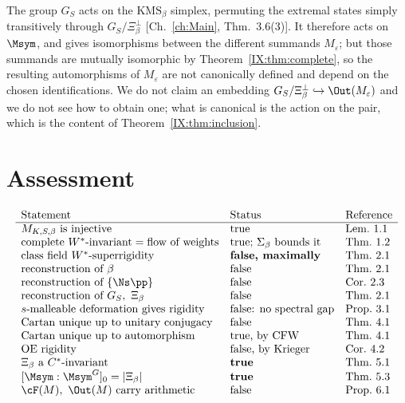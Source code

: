 \begin{remark}\label{IX:rem:out}
The group $G_S$ acts on the $\mathrm{KMS}_\beta$ simplex, permuting the extremal states
simply transitively through $G_S/\Xi_\beta^\perp$ [Ch.~\ref{ch:Main}, Thm.~3.6(3)]. It therefore acts
on $\Msym$, and gives isomorphisms between the different summands $M_\varepsilon$; but those
summands are mutually isomorphic by Theorem~\ref{IX:thm:complete}, so the resulting
automorphisms of $M_\varepsilon$ are not canonically defined and depend on the chosen
identifications. We do not claim an embedding $G_S/\Xi_\beta^\perp\hookrightarrow\Out(M_\varepsilon)$
and we do not see how to obtain one; what is canonical is the action on the pair, which is
the content of Theorem~\ref{IX:thm:inclusion}.
\end{remark}

\section{Assessment}

\[
\begin{array}{lll}
\text{Statement} & \text{Status} & \text{Reference}\\\hline
M_{K,S,\beta}\ \text{is injective} & \text{true} & \text{Lem.~1.1}\\
\text{complete }W^*\text{-invariant}=\text{flow of weights} & \text{true; }\Sigma_\beta\text{ bounds it} & \text{Thm.~1.2}\\
\text{class field }W^*\text{-superrigidity} & \textbf{false, maximally} & \text{Thm.~2.1}\\
\text{reconstruction of }\beta & \text{false} & \text{Thm.~2.1}\\
\text{reconstruction of }\{\Ns\pp\} & \text{false} & \text{Cor.~2.3}\\
\text{reconstruction of }G_S,\ \Xi_\beta & \text{false} & \text{Thm.~2.1}\\
s\text{-malleable deformation gives rigidity} & \text{false: no spectral gap} & \text{Prop.~3.1}\\
\text{Cartan unique up to unitary conjugacy} & \text{false} & \text{Thm.~4.1}\\
\text{Cartan unique up to automorphism} & \text{true, by CFW} & \text{Thm.~4.1}\\
\text{OE rigidity} & \text{false, by Krieger} & \text{Cor.~4.2}\\
\Xi_\beta\ \text{a }C^*\text{-invariant} & \textbf{true} & \text{Thm.~5.1}\\
{[\Msym:\Msym^G]_0}=|\Xi_\beta| & \textbf{true} & \text{Thm.~5.3}\\
\cF(M),\ \Out(M)\ \text{carry arithmetic} & \text{false} & \text{Prop.~6.1}
\end{array}
\]

